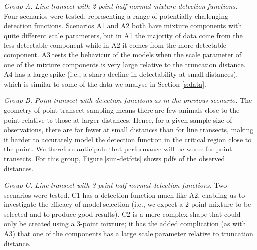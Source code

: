\documentclass[authoryear,preprint,review,12pt]{elsarticle}
\begin{document}
\textit{Group A. Line transect with 2-point half-normal mixture detection functions.} Four scenarios were tested, representing a range of potentially challenging detection functions.  Scenarios A1 and A2 both have mixture components with quite different scale parameters, but in A1 the majority of data come from the less detectable component while in A2 it comes from the more detectable component.  A3 tests the behaviour of the models when the scale parameter of one of the mixture components is very large relative to the truncation distance. A4 has a large spike (i.e., a sharp decline in detectability at small distances), which is similar to some of the data we analyse in Section \ref{s:data}.

\textit{Group B. Point transect with detection functions as in the previous scenario.} The geometry of point transect sampling means there are few animals close to the point relative to those at larger distances. Hence, for a given sample size of observations, there are far fewer at small distances than for line transects, making it harder to accurately model the detection function in the critical region close to the point.  We therefore anticipate that performance will be worse for point transects. For this group, Figure \ref{sim-detfcts} shows pdfs of the observed distances.

\textit{Group C. Line transect with 3-point half-normal detection functions.} Two scenarios were tested. C1 has a detection function much like A2, enabling us to investigate the efficacy of model selection (i.e., we expect a 2-point mixture to be selected and to produce good results). C2 is a more complex shape that could only be created using a 3-point mixture; it has the added complication (as with A3) that one of the components has a large scale parameter relative to truncation distance.
\end{document}
